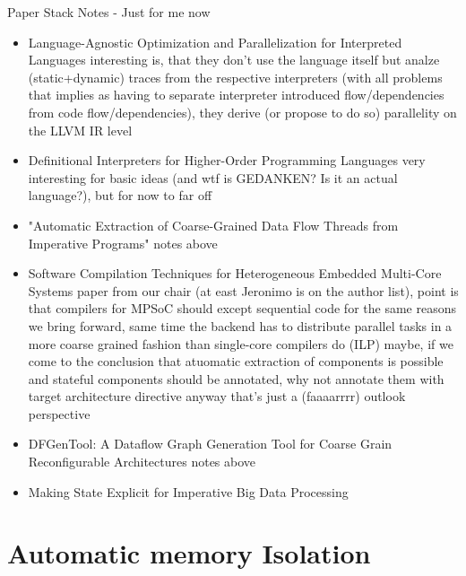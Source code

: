 Paper Stack Notes - Just for me now
\begin{itemize}
    \item Language-Agnostic Optimization and Parallelization for Interpreted Languages \means interesting is, that they don't use the language itself but analze (static+dynamic) traces from the respective interpreters (with all problems that implies as having to separate interpreter introduced flow/dependencies from code flow/dependencies), they derive (or propose to do so) parallelity on the LLVM IR level
    \item Definitional Interpreters for Higher-Order Programming Languages \means very interesting for basic ideas (and wtf is GEDANKEN? Is it an actual language?), but for now to far off
    \item "Automatic Extraction of Coarse-Grained Data Flow Threads from Imperative Programs" \means notes above
    \item Software Compilation Techniques for
Heterogeneous Embedded Multi-Core Systems \means paper from our chair (at east Jeronimo is on the author list), point is that compilers for MPSoC should except sequential code for the same reasons we bring forward, same time the backend has to distribute parallel tasks in a more coarse grained fashion than single-core compilers do (ILP) \means maybe, if we come to the conclusion that atuomatic extraction of components is possible and stateful components should be annotated, why not annotate them with target architecture directive \means anyway that's just a (faaaarrrr) outlook perspective
\item DFGenTool: A Dataflow Graph Generation Tool for Coarse Grain Reconfigurable Architectures \means notes above
\item Making State Explicit for Imperative Big Data Processing
\end{itemize}

\section{Automatic memory Isolation}